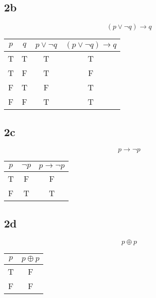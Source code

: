 \documentclass[letterpaper, 12pt]{math}
\begin{document}
\subsection*{2b}
\[ (p \vee \neg{q}) \to q \]
\begin{center}
  \begin{tabular}{|c|c|c|c|}
    \hline
    \( p \) & \( q \) & \( p \vee \neg{q} \) & \( (p \vee \neg{q}) \to q \) \\
      \hline
    T       & T       & T                    & T \\ \hline
    T       & F       & T                    & F \\ \hline
    F       & T       & F                    & T \\ \hline
    F       & F       & T                    & T \\ \hline
  \end{tabular}
\end{center}

\subsection*{2c}
\[ p \to \neg{p} \]
\begin{center}
  \begin{tabular}{|c|c|c|}
    \hline
    \( p \) & \( \neg{p} \) & \( p \to \neg{p} \) \\ \hline
    T       & F             & F                   \\ \hline
    F       & T             & T                   \\ \hline
  \end{tabular}
\end{center}

\subsection*{2d}
\[ p \oplus p \]
\begin{center}
  \begin{tabular}{|c|c|}
    \hline
    \( p \) & \( p \oplus p \) \\ \hline
    T       & F                \\ \hline
    F       & F                \\ \hline
  \end{tabular}
\end{center}
\end{document}
